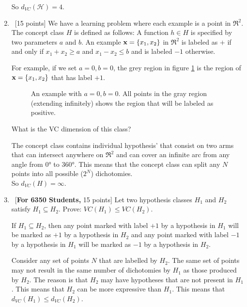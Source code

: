 \begin{enumerate}
So $d_{VC}(\mathcal{H}) = 4$.

\item ~[15 points] We have a learning problem where each example is a
  point in $\Re^2$. The concept class $H$ is defined as follows: A
  function $h \in H$ is specified by two parameters $a$ and $b$. An
  example ${\bf x} = \{x_1, x_2\}$ in $\Re^2$ is labeled as $+$ if and
  only if $x_1 + x_2 \geq a$ and $x_1 - x_2 \leq b$ and is labeled $-1$
  otherwise.

  For example, if we set $a = 0, b = 0$, the grey region in figure
  \ref{f1} is the region of ${\bf x} = \{x_1, x_2\}$ that has label
  $+1$.

  \begin{figure}[h!]
    \centering
    \caption{An example with $a = 0, b = 0$. All points in the gray region
      (extending infinitely) shows the region that will be labeled as
      positive.} \label{f1}
  \end{figure}



  What is the VC dimension of this class?

The concept class contains individual hypothesis' that consist on two arms that can intersect anywhere on $\Re^2$ and can cover an infinite arc from any angle from $0\si{\degree}$ to $360\si{\degree}$. This means that the concept class can split any $N$ points into all possible ($2^N$) dichotomies.\\

So $d_{VC}(H) = \infty$.

\item ~[{\bf For 6350 Students,} 15 points] Let two hypothesis classes
  $H_1$ and $H_2$ satisfy $H_1 \subseteq H_2$. Prove: $VC(H_1) \leq
  VC(H_2)$.

If $H_1 \subseteq H_2$, then any point marked with label $+1$ by a hypothesis in $H_1$ will be marked as $+1$ by a hypothesis in $H_2$ and any point marked with label $-1$ by a hypothesis in $H_1$ will be marked as $-1$ by a hypothesis in $H_2$.

Consider any set of points $N$ that are labelled by $H_2$. The same set of points may not result in the same number of dichotomies by $H_1$ as those produced by $H_2$. The reason is that $H_2$ may have hypotheses that are not present in $H_1$. This means that $H_2$ can be more expressive than $H_1$. This means that $d_{VC}(H_1) \leq d_{VC}(H_2)$.

\end{enumerate}
